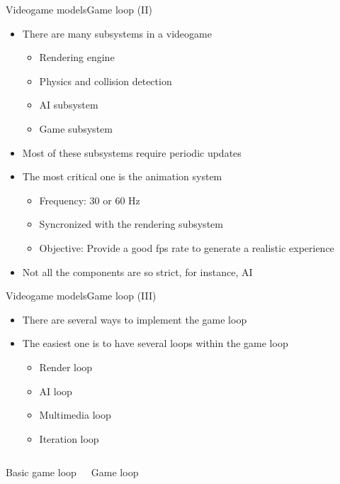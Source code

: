 \documentclass[10pt,compress]{beamer} %
\begin{document}
\begin{frame}{Videogame models}{Game loop (II)}
		\begin{itemize}
		   	\item There are many subsystems in a videogame
			\begin{itemize}
				\item Rendering engine
				\item Physics and collision detection
				\item AI subsystem
				\item Game subsystem
			\end{itemize}
			\item Most of these subsystems require periodic updates
			\item The most critical one is the animation system
			\begin{itemize}
				\item Frequency: 30 or 60 Hz
				\item Syncronized with the rendering subsystem
				\item Objective: Provide a good fps rate to generate a realistic experience
			\end{itemize}
			\item Not all the components are so strict, for instance, AI
		\end{itemize}
\end{frame}

\begin{frame}{Videogame models}{Game loop (III)}
	\begin{itemize}
	   	\item There are several ways to implement the game loop
	   	\item The easiest one is to have several loops within the game loop
		\begin{itemize}
			\item Render loop
			\item AI loop
			\item Multimedia loop
			\item Iteration loop
		\end{itemize}
	\end{itemize}

    \begin{columns}
    \begin{block}{Basic game loop}
	    \vspace{-0.2cm}
	    
		\vspace{-0.2cm}
	\end{block}
    \begin{block}{Game loop}
	    \vspace{-0.2cm}
	    
		\vspace{-0.2cm}
	\end{block}
	\end{columns}
\end{frame}
\end{document}
